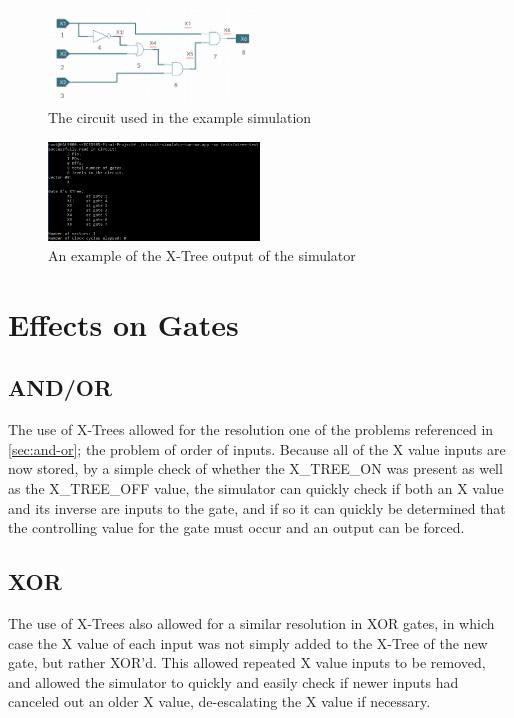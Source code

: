 \documentclass[12pt]{report}
\begin{document}
\begin{figure}[h]
	\centering
	\includegraphics[width=0.5\textwidth]{xtree-circuit.png}
	\caption[X-Tree Circuit]{The circuit used in the example simulation}
	\label{fig:xtree-ckt}
\end{figure}

\begin{figure}[h]
	\centering
	\includegraphics[width=0.5\textwidth]{sim-output.png}
	\caption[X-Tree Output]{An example of the X-Tree output of the simulator}
	\label{fig:sim-output}
\end{figure}

\section{Effects on Gates}\label{sec:xtree-effects}

\subsection{AND/OR}
The use of X-Trees allowed for the resolution one of the problems referenced in \cref{sec:and-or}; the problem of order of inputs. Because all of the X value inputs are now stored, by a simple check of whether the X\_TREE\_ON was present as well as the X\_TREE\_OFF value, the simulator can quickly check if both an X value and its inverse are inputs to the gate, and if so it can quickly be determined that the controlling value for the gate must occur and an output can be forced.

\subsection{XOR}
The use of X-Trees also allowed for a similar resolution in XOR gates, in which case the X value of each input was not simply added to the X-Tree of the new gate, but rather XOR'd. This allowed repeated X value inputs to be removed, and allowed the simulator to quickly and easily check if newer inputs had canceled out an older X value, de-escalating the X value if necessary.
\end{document}
